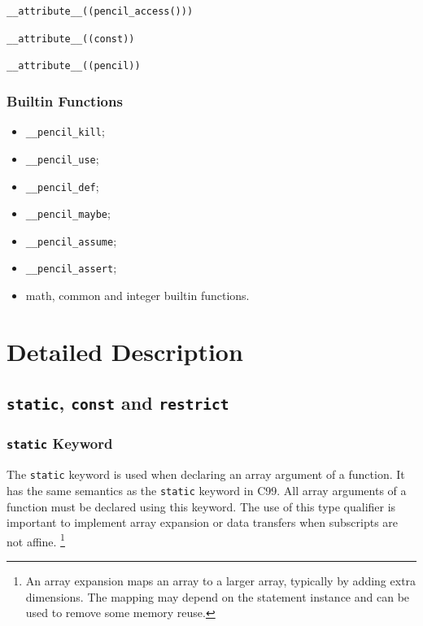 \begin{description}
  \item \lstinline!__attribute__((pencil_access()))!
  \item \lstinline!__attribute__((const))!
  \item \lstinline!__attribute__((pencil))!
\end{description}

\subsubsection*{Builtin Functions}

\begin{itemize}
\item \lstinline!__pencil_kill!;
\item \lstinline!__pencil_use!;
\item \lstinline!__pencil_def!;
\item \lstinline!__pencil_maybe!;
\item \lstinline!__pencil_assume!;
\item \lstinline!__pencil_assert!;
\item \pencil math, common and integer builtin functions.
\end{itemize}

\section{Detailed Description}
\label{sec:Annotations-and-directives}

\subsection{\texttt{static}, \texttt{const} and \texttt{restrict}}
\label{sec:array-type-qualifiers-section}

\subsubsection{\texttt{static} Keyword}
\label{sec:static}


The \lstinline!static! keyword is used when declaring an array argument of a \pencil function.
It
has the same semantics as the \lstinline!static! keyword in C99.
All array arguments of a \pencil function
must be declared using this keyword.
The use of this type qualifier is
important to implement array expansion or data transfers when
subscripts are not affine.%
\footnote{An array expansion maps an array to a larger array, typically
by adding extra dimensions.  The mapping may depend on the statement
instance and can be used to remove some memory reuse.}


